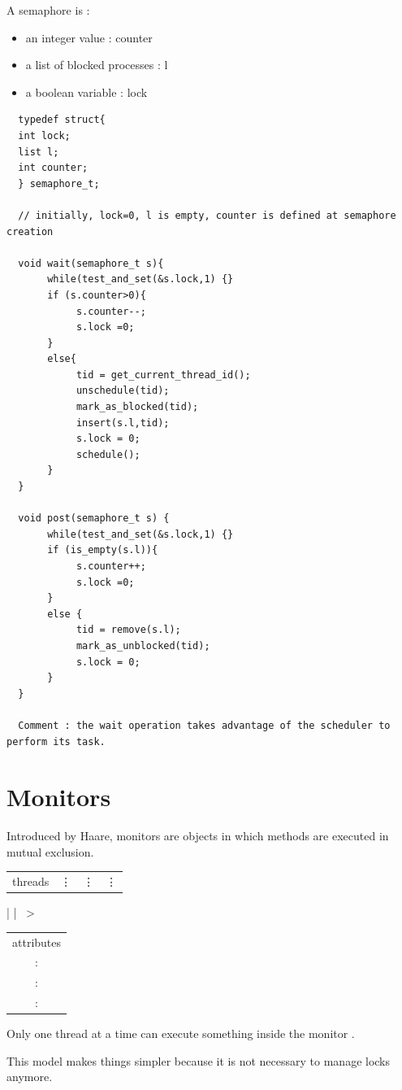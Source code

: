 \documentclass[a4paper,10pt]{article}
\begin{document}
A semaphore is :
\begin{itemize}
  \item an integer value : counter
  \item a list of blocked processes : l
  \item a boolean variable : lock
\end{itemize}
\begin{verbatim}
  typedef struct{
  int lock;
  list l;
  int counter;
  } semaphore_t;
  
  // initially, lock=0, l is empty, counter is defined at semaphore creation
  
  void wait(semaphore_t s){
       while(test_and_set(&s.lock,1) {}
       if (s.counter>0){
            s.counter--;
            s.lock =0;
       }
       else{
            tid = get_current_thread_id();
            unschedule(tid);
            mark_as_blocked(tid);
            insert(s.l,tid);
            s.lock = 0;
            schedule();
       }
  }
  
  void post(semaphore_t s) {
       while(test_and_set(&s.lock,1) {}
       if (is_empty(s.l)){
            s.counter++;
            s.lock =0;   
       }
       else {
            tid = remove(s.l);
            mark_as_unblocked(tid);
            s.lock = 0;
       }
  }
  
  Comment : the wait operation takes advantage of the scheduler to perform its task.
\end{verbatim}

\section{Monitors}

Introduced by Haare, monitors are objects in which methods are executed in mutual exclusion.

\begin{tabular}{cccc}
  threads & \vdots & \vdots & \vdots
\end{tabular}
|
| 
\textgreater
\begin{tabular}{|c|}
 attributes \\
 : \\
 : \\
 : \\
\end{tabular}

Only one thread at a time can execute something inside the monitor .

This model makes things simpler because it is not necessary to manage locks anymore.
\end{document}
